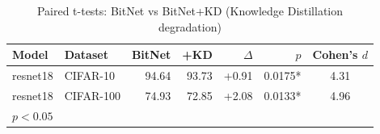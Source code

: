 \begin{table}[h]
\centering
\caption{Paired t-tests: BitNet vs BitNet+KD (Knowledge Distillation degradation)}
\label{tab:kd_statistics}
\begin{tabular}{llrrrrc}
\toprule
Model & Dataset & BitNet & +KD & $\Delta$ & $p$ & Cohen's $d$ \\
\midrule
resnet18 & CIFAR-10 & 94.64 & 93.73 & +0.91 & 0.0175* & 4.31 \\
resnet18 & CIFAR-100 & 74.93 & 72.85 & +2.08 & 0.0133* & 4.96 \\
\bottomrule
\multicolumn{7}{l}{\footnotesize * $p < 0.05$} \\
\end{tabular}
\end{table}